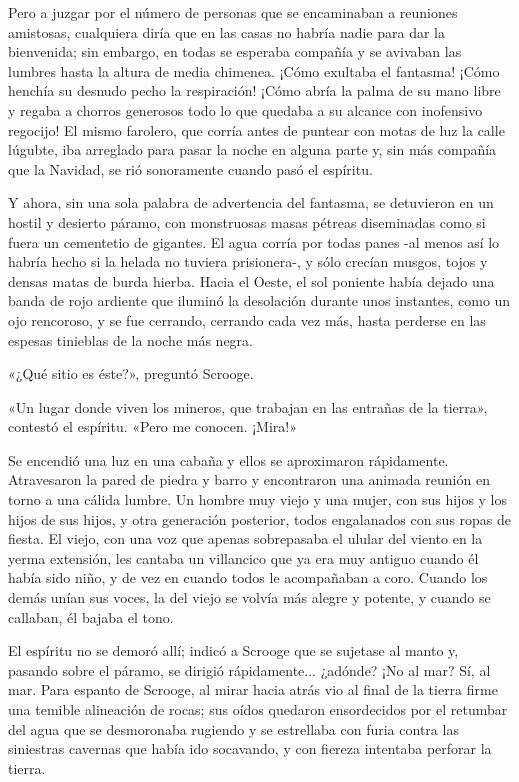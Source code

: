 \documentclass{novela}
\begin{document}
 Pero a juzgar por el número de personas que se encaminaban a reuniones amistosas, cualquiera diría que en las casas no habría nadie para dar la bienvenida; sin embargo, en todas se esperaba compañía y se avivaban las lumbres hasta la altura de media chimenea. ¡Cómo exultaba el fantasma! ¡Cómo henchía su desnudo pecho la respiración! ¡Cómo abría la palma de su mano libre y regaba a chorros generosos todo lo que quedaba a su alcance con inofensivo regocijo! El mismo farolero, que corría antes de puntear con motas de luz la calle lúgubte, iba arreglado para pasar la noche en alguna parte y, sin más compañía que la Navidad, se rió sonoramente cuando pasó el espíritu.

 Y ahora, sin una sola palabra de advertencia del fantasma, se detuvieron en un hostil y desierto páramo, con monstruosas masas pétreas diseminadas como si fuera un cementetio de gigantes. El agua corría por todas panes -al menos así lo habría hecho si la helada no tuviera prisionera-, y sólo crecían musgos, tojos y densas matas de burda hierba. Hacia el Oeste, el sol poniente había dejado una banda de rojo ardiente que iluminó la desolación durante unos instantes, como un ojo rencoroso, y se fue cerrando, cerrando cada vez más, hasta perderse en las espesas tinieblas de la noche más negra.

 «¿Qué sitio es éste?», preguntó Scrooge.

 «Un lugar donde viven los mineros, que trabajan en las entrañas de la tierra», contestó el espíritu. «Pero me conocen. ¡Mira!»

 Se encendió una luz en una cabaña y ellos se aproximaron rápidamente. Atravesaron la pared de piedra y barro y encontraron una animada reunión en torno a una cálida lumbre. Un hombre muy viejo y una mujer, con sus hijos y los hijos de sus hijos, y otra generación posterior, todos engalanados con sus ropas de fiesta. El viejo, con una voz que apenas sobrepasaba el ulular del viento en la yerma extensión, les cantaba un villancico que ya era muy antiguo cuando él había sido niño, y de vez en cuando todos le acompañaban a coro. Cuando los demás unían sus voces, la del viejo se volvía más alegre y potente, y cuando se callaban, él bajaba el tono.

 El espíritu no se demoró allí; indicó a Scrooge que se sujetase al manto y, pasando sobre el páramo, se dirigió rápidamente... ¿adónde? ¡No al mar? Sí, al mar. Para espanto de Scrooge, al mirar hacia atrás vio al final de la tierra firme una temible alineación de rocas; sus oídos quedaron ensordecidos por el retumbar del agua que se desmoronaba rugiendo y se estrellaba con furia contra las siniestras cavernas que había ido socavando, y con fiereza intentaba perforar la tierra.
\end{document}
